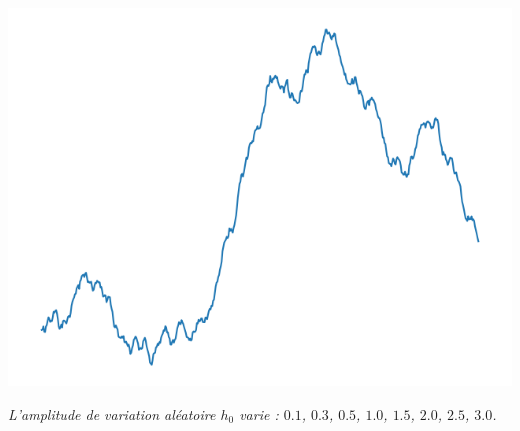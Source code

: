 \documentclass[11pt,class=report,crop=false]{standalone}
\begin{document}
\begin{exemple}
\begin{center}
\includegraphics[scale=\myscale,scale=0.2]{figures/landscape-05-30}

\nopagebreak

\begin{minipage}{0.8\textwidth}
\center\emph{
L'amplitude de variation aléatoire $h_0$ varie : $0.1$, $0.3$, $0.5$, $1.0$, $1.5$, $2.0$, $2.5$, $3.0$.}
\end{minipage}

\end{center}

\end{exemple}
\end{document}
